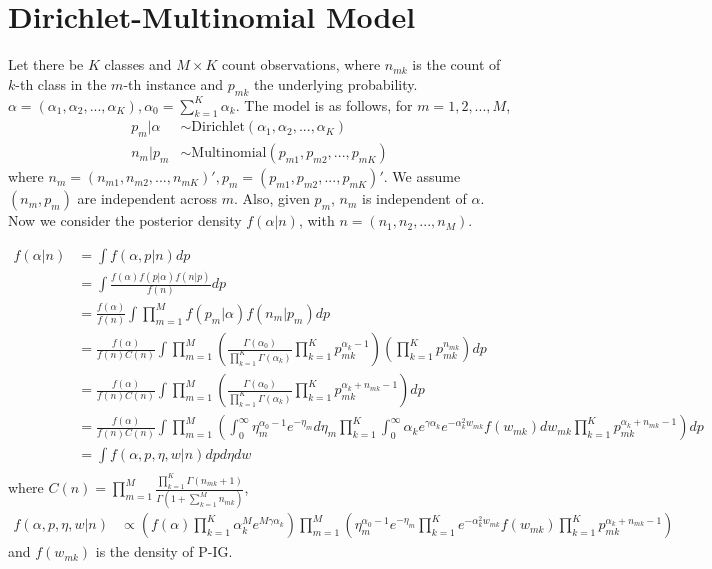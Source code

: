 \documentclass[11pt, oneside]{article}
\begin{document}
\section{Dirichlet-Multinomial Model}
Let there be $K$ classes and $M\times K$ count observations,  where $n_{mk}$ is the count of $k$-th class in the $m$-th instance and $p_{mk}$ the underlying probability. $\alpha = (\alpha_1, \alpha_2, ..., \alpha_K), \alpha_0 = \sum_{k=1}^K \alpha_k$. The model is as follows, for $m=1, 2, ..., M$,
\begin{align*}
p_m | \alpha & \sim \text{Dirichlet}(\alpha_1, \alpha_2, ..., \alpha_K)\\
n_m | p_m & \sim \text{Multinomial}(p_{m1}, p_{m2}, ..., p_{mK})
\end{align*}
where $n_m = (n_{m1}, n_{m2}, ..., n_{mK})', p_m = (p_{m1}, p_{m2}, ..., p_{mK})'$. 
We assume $(n_m, p_m)$ are independent across $m$. Also, given $p_m$, $n_m$ is independent of $\alpha$. Now we consider the posterior density $f(\alpha|n)$, with $n = (n_1, n_2, ..., n_M)$.

\begin{align*}
f(\alpha | n) &= \int f(\alpha, p | n) dp\\
&= \int \frac{f(\alpha)f(p|\alpha)f(n|p)}{f(n)} dp \\
&= \frac{f(\alpha)}{f(n)} \int \prod_{m=1}^M f(p_m|\alpha)f(n_m|p_m) dp\\
&= \frac{f(\alpha)}{f(n)C(n)} \int \prod_{m=1}^M \left(\frac{\Gamma(\alpha_0)}{\prod_{k=1}^K \Gamma(\alpha_k)}\prod_{k=1}^K p_{mk}^{\alpha_k-1} \right)\left(\prod_{k=1}^K p_{mk}^{n_{mk}}\right)   dp\\
&= \frac{f(\alpha)}{f(n)C(n)} \int \prod_{m=1}^M \left(\frac{\Gamma(\alpha_0)}{\prod_{k=1}^K \Gamma(\alpha_k)}\prod_{k=1}^K p_{mk}^{\alpha_k+n_{mk}-1} \right) dp\\
&= \frac{f(\alpha)}{f(n)C(n)} \int \prod_{m=1}^M \left(\int_0^\infty \eta_m^{\alpha_0 - 1} e^{-\eta_m} d \eta_m \prod_{k=1}^K \int_0^\infty \alpha_k e^{\gamma\alpha_k} e^{-\alpha_k^2 w_{mk}}f(w_{mk})dw_{mk}\prod_{k=1}^K p_{mk}^{\alpha_k+n_{mk}-1} \right) dp\\
&=  \int f(\alpha, p, \eta, w | n)dpd\eta dw\\
\end{align*}
where $C(n) = \prod_{m=1}^M \frac{\prod_{k=1}^K \Gamma(n_{mk}+1)}{\Gamma(1 + \sum_{k=1}^M n_{mk})}$,
\begin{align*}
f(\alpha, p, \eta, w | n) &\propto \left(f(\alpha) \prod_{k=1}^K \alpha_k^M e^{M\gamma\alpha_k} \right)\prod_{m=1}^M  \left( \eta_m^{\alpha_0 - 1} e^{-\eta_m}  \prod_{k=1}^K   e^{-\alpha_k^2 w_{mk}}f(w_{mk})\prod_{k=1}^K p_{mk}^{\alpha_k+n_{mk}-1} \right) 
\end{align*}
and $f(w_{mk})$ is the density of $\text{P-IG}$. 
\end{document}
